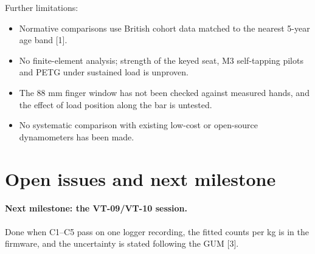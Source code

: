 \documentclass[10pt,a4paper]{article}
\begin{document}
Further limitations:
\begin{itemize}
  \item Normative comparisons use British cohort data matched to the nearest 5-year age band [1].
  \item No finite-element analysis; strength of the keyed seat, M3 self-tapping pilots and PETG under sustained load is unproven.
  \item The 88 mm finger window has not been checked against measured hands, and the effect of load position along the bar is untested.
  \item No systematic comparison with existing low-cost or open-source dynamometers has been made.
\end{itemize}

\section{Open issues and next milestone}\label{sec:open}

\paragraph{Next milestone: the VT-09/VT-10 session.} Done when C1–C5 pass on one logger recording, the fitted counts per kg is in the firmware, and the uncertainty is stated following the GUM [3].
\end{document}
